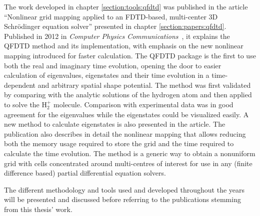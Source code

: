 The work developed in chapter \ref{section:tools:qfdtd} was published in the article
``Nonlinear grid mapping applied to an FDTD-based, multi-center 3D
Schr\"odinger equation solver'' presented in chapter \ref{section:papers:qfdtd}.
Published in 2012 in \textit{Computer Physics Communications}~\cite{Bigaouette2011}, it
explains the QFDTD method and its implementation, with emphasis on the new
nonlinear mapping introduced for faster calculation. The QFDTD package is the
first to use both the real and imaginary time evolution, opening the door to
easier calculation of eigenvalues, eigenstates and their time evolution in a time-dependent
and arbitrary spatial shape potential.
The method was first validated by comparing with the analytic solutions of
the hydrogen atom and then applied to solve the H$_{2}^{+}$ molecule.
Comparison with experimental data was in good agreement for the eigenvalues
while the eigenstates could be visualized easily. A new method to calculate
eigenstates is also presented in the article. The publication also
describes in detail the nonlinear mapping that allows reducing both the memory
usage required to store the grid and the time required to calculate the time
evolution. The method is a generic way to obtain a nonuniform grid with cells
concentrated around multi-centres of interest for use in any (finite difference
based) partial differential equation solvers.

The different
methodology and tools used and developed throughout the years will be presented
and discussed before referring to the publications stemming from this thesis' work.


